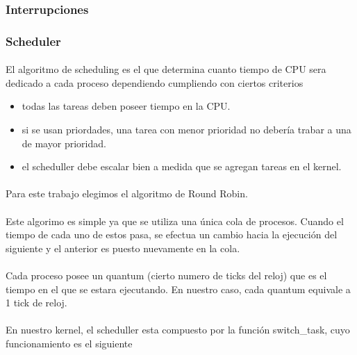 \documentclass[11pt, a4paper]{article}
\begin{document}
\subsubsection{Interrupciones}




\subsubsection{Scheduler}
\paragraph{}
El algoritmo de scheduling es el que determina cuanto tiempo de CPU sera dedicado a cada proceso dependiendo cumpliendo con ciertos criterios
\begin{itemize}
\item todas las tareas deben poseer tiempo en la CPU.
\item si se usan priordades, una tarea con menor prioridad no debería trabar a una de mayor prioridad.
\item el scheduller debe escalar bien a medida que se agregan tareas en el kernel.
\end{itemize}


\paragraph{}
Para este trabajo elegimos el algoritmo de Round Robin.

\paragraph{}

Este algorimo es simple ya que se utiliza una única cola de procesos. Cuando el tiempo de cada uno de estos pasa, se efectua un cambio hacia la ejecución del siguiente y el anterior es puesto nuevamente en la cola. 
\paragraph{}
Cada proceso posee un quantum (cierto numero de ticks del reloj) que es el tiempo en el que se estara ejecutando. En nuestro caso, cada quantum equivale a 1 tick de reloj.


\paragraph{}
En nuestro kernel, el scheduller esta compuesto por la funci\'on switch\_task, cuyo funcionamiento es el siguiente
\end{document}
